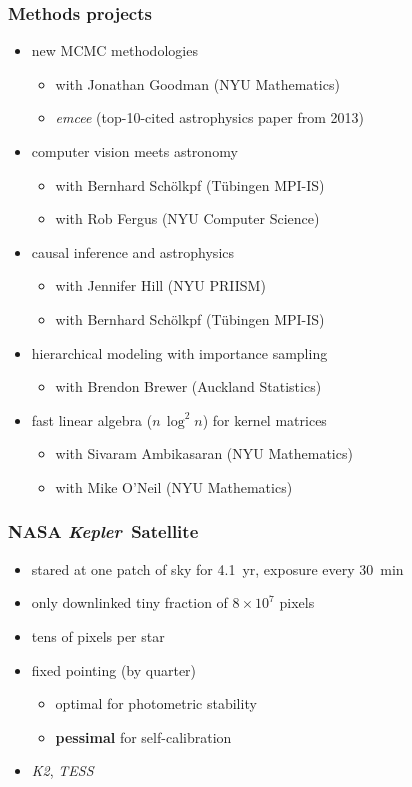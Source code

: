 \documentclass[aspectratio=169]{beamer}
\renewcommand{\emph}[1]{\textbf{#1}}
\newcommand{\project}[1]{\textsl{#1}}
\newcommand{\Kepler}{\project{Kepler}}
\begin{document}
\begin{frame}
  \frametitle{Methods projects}
  \begin{itemize}
  \item new MCMC methodologies
    \begin{itemize}
    \item with Jonathan Goodman (NYU Mathematics)
    \item \project{emcee} (top-10-cited astrophysics paper from 2013)
    \end{itemize}
  \item computer vision meets astronomy
    \begin{itemize}
    \item with Bernhard Sch\"olkpf (T\"ubingen MPI-IS)
    \item with Rob Fergus (NYU Computer Science)
    \end{itemize}
  \item causal inference and astrophysics
    \begin{itemize}
    \item with Jennifer Hill (NYU PRIISM)
    \item with Bernhard Sch\"olkpf (T\"ubingen MPI-IS)
    \end{itemize}
  \item hierarchical modeling with importance sampling
    \begin{itemize}
    \item with Brendon Brewer (Auckland Statistics)
    \end{itemize}
  \item fast linear algebra ($n\,\log^2n$) for kernel matrices
    \begin{itemize}
    \item with Sivaram Ambikasaran (NYU Mathematics)
    \item with Mike O'Neil (NYU Mathematics)
    \end{itemize}
  \end{itemize}
\end{frame}

\begin{frame}
  \frametitle{NASA \Kepler\ Satellite}
  \begin{itemize}
  \item stared at one patch of sky for 4.1~yr, exposure every 30~min
  \item only downlinked tiny fraction of $8\times 10^7$ pixels
  \item tens of pixels per star
  \item fixed pointing (by quarter)
    \begin{itemize}
    \item optimal for photometric stability
    \item \emph{pessimal} for self-calibration
    \end{itemize}
  \item \project{K2}, \project{TESS}
  \end{itemize}
\end{frame}
\end{document}
